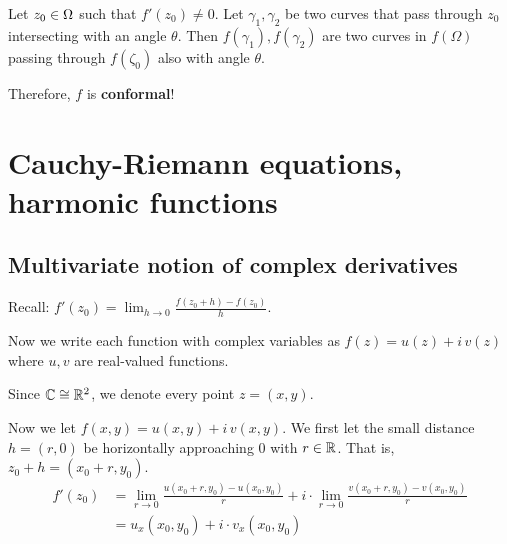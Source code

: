 \documentclass[12pt]{article}
\begin{document}

Let $z_0\in \Omega$ such that $f'(z_0)\neq 0$. Let $\gamma_1, \gamma_2$ be two curves that pass through $z_0$ intersecting with an angle $\theta$. Then $f(\gamma_1), f(\gamma_2)$ are two curves in $f(\Omega)$ passing through $f(\zeta_0)$ also with angle $\theta$.

Therefore, $f$ is \textbf{conformal}!

\section{Cauchy-Riemann equations, harmonic functions}
\subsection{Multivariate notion of complex derivatives}
Recall: $\displaystyle f'(z_0)=\lim_{h\to 0}\frac{f(z_0+h)-f(z_0)}{h}$.

Now we write each function with complex variables as $f(z)=u(z)+i\, v(z)$ where $u,v$ are real-valued  functions.

Since $\mathbb{C}\cong \mathbb{R}^2$, we denote every point $z=(x,y)$.

Now we let $f(x,y)=u(x,y)+i\,v(x,y)$. We first let the small distance $h=(r,0)$ be horizontally approaching 0 with $r\in \mathbb{R}$. That is, $z_0+h=(x_0+r,y_0)$.
\begin{align*}
    f'(z_0) &= \lim_{r\to 0} \frac{u(x_0+r, y_0)-u(x_0,y_0)}{r} + i\cdot \lim_{r\to 0}\frac{v(x_0+r, y_0)-v(x_0,y_0)}{r}\\
    &=u_x(x_0,y_0)+i\cdot v_x(x_0,y_0)
\end{align*}
\end{document}
